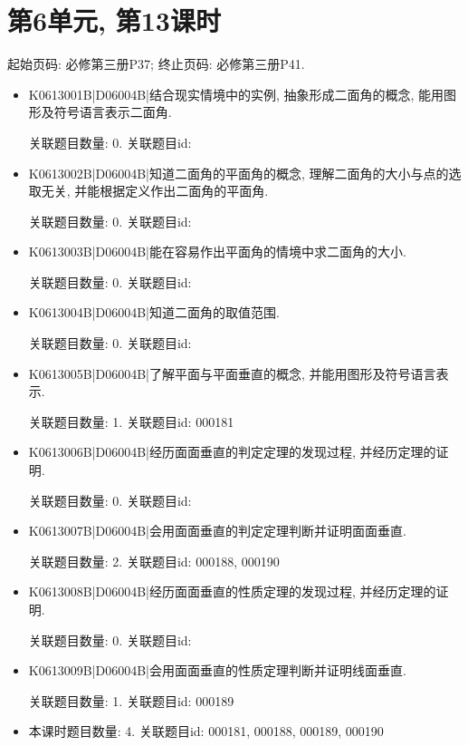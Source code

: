 \section*{第6单元, 第13课时}
起始页码: 必修第三册P37; 终止页码: 必修第三册P41.
\begin{itemize}
\item K0613001B|D06004B|结合现实情境中的实例, 抽象形成二面角的概念, 能用图形及符号语言表示二面角.

关联题目数量: 0. 关联题目id: 

\item K0613002B|D06004B|知道二面角的平面角的概念, 理解二面角的大小与点的选取无关, 并能根据定义作出二面角的平面角.

关联题目数量: 0. 关联题目id: 

\item K0613003B|D06004B|能在容易作出平面角的情境中求二面角的大小.

关联题目数量: 0. 关联题目id: 

\item K0613004B|D06004B|知道二面角的取值范围.

关联题目数量: 0. 关联题目id: 

\item K0613005B|D06004B|了解平面与平面垂直的概念, 并能用图形及符号语言表示.

关联题目数量: 1. 关联题目id: 000181

\item K0613006B|D06004B|经历面面垂直的判定定理的发现过程, 并经历定理的证明.

关联题目数量: 0. 关联题目id: 

\item K0613007B|D06004B|会用面面垂直的判定定理判断并证明面面垂直.

关联题目数量: 2. 关联题目id: 000188, 000190

\item K0613008B|D06004B|经历面面垂直的性质定理的发现过程, 并经历定理的证明.

关联题目数量: 0. 关联题目id: 

\item K0613009B|D06004B|会用面面垂直的性质定理判断并证明线面垂直.

关联题目数量: 1. 关联题目id: 000189

\item 本课时题目数量: 4. 关联题目id: 000181, 000188, 000189, 000190

\end{itemize}


